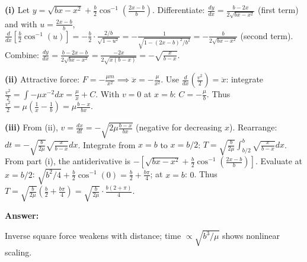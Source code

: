 \begin{solution}
\begin{center}
\end{center}

\textbf{(i)} Let $y = \sqrt{bx - x^2} + \frac{b}{2}\cos^{-1}\left(\frac{2x-b}{b}\right)$. Differentiate: $\frac{dy}{dx} = \frac{b-2x}{2\sqrt{bx-x^2}}$ (first term) and with $u = \frac{2x-b}{b}$, $\frac{d}{dx}\left[\frac{b}{2}\cos^{-1}(u)\right] = -\frac{b}{2} \cdot \frac{2/b}{\sqrt{1-u^2}} = -\frac{1}{\sqrt{1-(2x-b)^2/b^2}} = -\frac{b}{2\sqrt{bx-x^2}}$ (second term). Combine: $\frac{dy}{dx} = \frac{b-2x-b}{2\sqrt{bx-x^2}} = \frac{-2x}{2\sqrt{x(b-x)}} = -\sqrt{\frac{x}{b-x}}$.

 \quad {}

\textbf{(ii)} Attractive force: $F = -\frac{\mu m}{x^2} \implies \ddot{x} = -\frac{\mu}{x^2}$. Use $\frac{d}{dx}(\frac{v^2}{2}) = \ddot{x}$: integrate $\frac{v^2}{2} = \int -\mu x^{-2}dx = \frac{\mu}{x} + C$. With $v=0$ at $x=b$: $C = -\frac{\mu}{b}$. Thus $\frac{v^2}{2} = \mu\left(\frac{1}{x}-\frac{1}{b}\right) = \mu\frac{b-x}{bx}$.

 \quad {}

\textbf{(iii)} From (ii), $v = \frac{dx}{dt} = -\sqrt{2\mu\frac{b-x}{bx}}$ (negative for decreasing $x$). Rearrange: $dt = -\sqrt{\frac{b}{2\mu}}\sqrt{\frac{x}{b-x}}dx$. Integrate from $x=b$ to $x=b/2$: $T = \sqrt{\frac{b}{2\mu}}\int_{b/2}^b \sqrt{\frac{x}{b-x}}dx$. From part (i), the antiderivative is $-\left[\sqrt{bx-x^2} + \frac{b}{2}\cos^{-1}\left(\frac{2x-b}{b}\right)\right]$. Evaluate at $x=b/2$: $\sqrt{b^2/4} + \frac{b}{2}\cos^{-1}(0) = \frac{b}{2} + \frac{b\pi}{4}$; at $x=b$: $0$. Thus $T = \sqrt{\frac{b}{2\mu}}\left(\frac{b}{2} + \frac{b\pi}{4}\right) = \sqrt{\frac{b}{2\mu}} \cdot \frac{b(2+\pi)}{4}$.

\textbf{Answer:} 

Inverse square force weakens with distance; time $\propto \sqrt{b^3/\mu}$ shows nonlinear scaling.
\end{solution}

